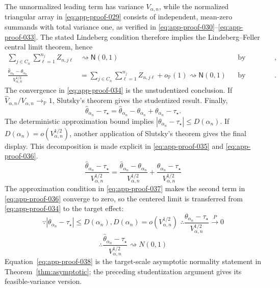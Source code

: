 \documentclass[11pt]{article}
\numberwithin{equation}{section}
\newcommand{\Pbb}{\mathbb P}
\newcommand{\1}{\mathbf 1}
\newcommand{\abs}[1]{\left\lvert #1\right\rvert}
\newcommand{\Normal}{\mathsf N}
\begin{document}
The unnormalized leading term has variance \(V_{\alpha,n}\), while the normalized triangular array in \eqref{eq:app-proof-029} consists of independent, mean-zero summands with total variance one, as verified in
\eqref{eq:app-proof-030}--\eqref{eq:app-proof-033}.  The stated Lindeberg
condition therefore implies the Lindeberg--Feller central limit theorem, hence
\begin{equation}
\label{eq:app-proof-034}
\begin{aligned}
\sum_{j\in C_n}\sum_{\ell=1}^{n_j}Z_{n,j\ell}
&\rightsquigarrow\Normal(0,1)
&&\text{by Lindeberg--Feller},\\
\frac{\widehat\theta_{\alpha_n}-\theta_{\alpha_n}}
{V_{\alpha,n}^{1/2}}
&=\sum_{j\in C_n}\sum_{\ell=1}^{n_j}Z_{n,j\ell}
+o_{\Pbb}(1)
\rightsquigarrow\Normal(0,1)
&&\text{by Slutsky's theorem}.
\end{aligned}
\end{equation}
The convergence in \eqref{eq:app-proof-034} is the unstudentized conclusion.
If \(\widehat V_{\alpha,n}/V_{\alpha,n}\to_{\Pbb}1\), Slutsky's theorem
gives the studentized result.  Finally,
\begin{equation}
\label{eq:app-proof-035}
\widehat\theta_{\alpha_n}-\tau_\star
  =
  \widehat\theta_{\alpha_n}-\theta_{\alpha_n}
  +\theta_{\alpha_n}-\tau_\star.
\end{equation}
The deterministic approximation bound implies
\(\abs{\theta_{\alpha_n}-\tau_\star}\le D(\alpha_n)\).  If
\(D(\alpha_n)=o(V_{\alpha,n}^{1/2})\), another application of Slutsky's
theorem gives the final display.  This decomposition is made explicit in
\eqref{eq:app-proof-035} and \eqref{eq:app-proof-036}.
\begin{equation}
\label{eq:app-proof-036}
\frac{\widehat\theta_{\alpha_n}-\tau_\star}{V_{\alpha,n}^{1/2}}=\frac{\widehat\theta_{\alpha_n}-\theta_{\alpha_n}}{V_{\alpha,n}^{1/2}}+\frac{\theta_{\alpha_n}-\tau_\star}{V_{\alpha,n}^{1/2}}
\end{equation}
The approximation condition in \eqref{eq:app-proof-037} makes the second
term in \eqref{eq:app-proof-036} converge to zero, so the centered limit is
transferred from \eqref{eq:app-proof-034} to the target effect:
\begin{equation}
\label{eq:app-proof-037}
\because \abs{\theta_{\alpha_n}-\tau_\star}\le D(\alpha_n),D(\alpha_n)=o(V_{\alpha,n}^{1/2})
\,\,\therefore \frac{\theta_{\alpha_n}-\tau_\star}{V_{\alpha,n}^{1/2}}\xrightarrow{P}0
\end{equation}
\begin{equation}
\label{eq:app-proof-038}
\therefore\frac{\widehat\theta_{\alpha_n}-\tau_\star}{V_{\alpha,n}^{1/2}}\rightsquigarrow N(0,1)
\end{equation}
Equation~\eqref{eq:app-proof-038} is the target-scale asymptotic normality
statement in Theorem~\ref{thm:asymptotic}; the preceding studentization
argument gives its feasible-variance version.
\end{document}
